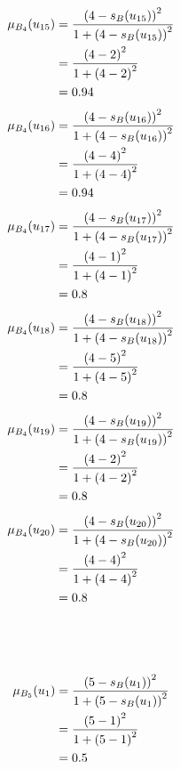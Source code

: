 \documentclass[a4paper]{book}
\begin{document}
				\begin{align}
					\mu_{B_4}(u_{15}) &= \frac{\left(4-s_B(u_{15})\right)^2}{1 + \left(4-s_B(u_{15})\right)^2}\\
					&= \frac{\left(4-2\right)^2}{1 + \left(4-2\right)^2} \notag \\
					&= 0.94 \notag
				\end{align}
				\begin{align}
					\mu_{B_4}(u_{16}) &= \frac{\left(4-s_B(u_{16})\right)^2}{1 + \left(4-s_B(u_{16})\right)^2}\\
					&= \frac{\left(4-4\right)^2}{1 + \left(4-4\right)^2} \notag \\
					&= 0.94 \notag
				\end{align}
				\begin{align}
					\mu_{B_4}(u_{17}) &= \frac{\left(4-s_B(u_{17})\right)^2}{1 + \left(4-s_B(u_{17})\right)^2}\\
					&= \frac{\left(4-1\right)^2}{1 + \left(4-1\right)^2} \notag \\
					&= 0.8 \notag
				\end{align}
				\begin{align}
					\mu_{B_4}(u_{18}) &= \frac{\left(4-s_B(u_{18})\right)^2}{1 + \left(4-s_B(u_{18})\right)^2}\\
					&= \frac{\left(4-5\right)^2}{1 + \left(4-5\right)^2} \notag \\
					&= 0.8 \notag
				\end{align}
				\begin{align}
					\mu_{B_4}(u_{19}) &= \frac{\left(4-s_B(u_{19})\right)^2}{1 + \left(4-s_B(u_{19})\right)^2}\\
					&= \frac{\left(4-2\right)^2}{1 + \left(4-2\right)^2} \notag \\
					&= 0.8 \notag
				\end{align}
				\begin{align}
					\mu_{B_4}(u_{20}) &= \frac{\left(4-s_B(u_{20})\right)^2}{1 + \left(4-s_B(u_{20})\right)^2}\\
					&= \frac{\left(4-4\right)^2}{1 + \left(4-4\right)^2} \notag \\
					&= 0.8 \notag
				\end{align}
				\\
				\\
				\\
				\begin{align}
					\mu_{B_5}(u_1) &= \frac{\left(5-s_B(u_1)\right)^2}{1 + \left(5-s_B(u_1)\right)^2}\\
					&= \frac{\left(5-1\right)^2}{1 + \left(5-1\right)^2} \notag \\
					&= 0.5 \notag
				\end{align}
\end{document}
